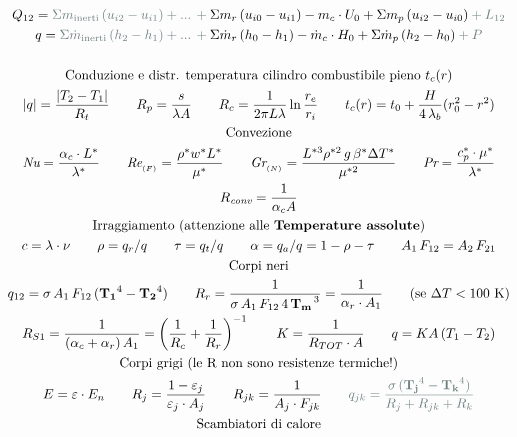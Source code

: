 \documentclass[9pt]{article}
\begin{document}
\begin{multicols}{2}
	\begin{gather*}
		Q_{12} = \color{gray1} \Sigma m_{\text{inerti}} \, (u_{i2} - u_{i1}) + ...  \,  + \color{black} \Sigma m_r \, (u_{i0} - u_{i1}) - m_c \cdot U_0 + \Sigma m_p \, (u_{i2} - u_{i0}) \color{gray1} + L_{12}\\
		q = \color{gray1} \Sigma \dot{m}_{\text{inerti}} \, (h_2-h_1) + ...  \,  + \color{black} \Sigma \dot{m}_r \, (h_0 - h_1) - \dot{m}_c \cdot H_0 + \Sigma \dot{m}_p \, (h_2 - h_0) \color{gray1} + P
		\\\\
		\text{Conduzione e distr. temperatura cilindro combustibile pieno } t_c(r)\\
		|q| = \frac{|T_2 - T_1|}{R_t} \qquad R_p = \frac{s}{\lambda A} \qquad R_c = \frac{1}{2 \pi L \lambda} \ln \frac{r_e}{r_i} \qquad
		t_c(r) = t_0 + \frac{H}{4\, \lambda_b}(r_0^2-r^2)\\
		\text{Convezione}\\
		\textit{Nu} = \frac{\alpha_c \cdot L^*}{\lambda^*} \qquad \textit{Re}_{_{(F)}} = \frac{\rho^* w^* L^*}{\mu^*} \qquad \textit{Gr}_{_{(N)}} = \frac{L^{*3} \rho^{*2}\,g\,\beta^* \Delta T^*}{\mu^{*2}} \qquad \textit{Pr} = \frac{c_p^* \cdot\mu^*}{\lambda^*} \\ R_{\textit{conv}} = \frac{1}{\alpha_c A}
		\\
		\text{Irraggiamento (attenzione alle } \textbf{Temperature assolute} \text{)}\\
		c=\lambda \cdot \nu \qquad \rho = q_r/q \qquad \tau = q_t/q \qquad \alpha = q_a/q=1- \rho - \tau \qquad A_1 \, F_{12} = A_2 \, F_{21}\\
		\text{Corpi neri}\\
		q_{12} = \sigma \, A_1 \, F_{12}\, (\mathbf{T_1}^{4} - \mathbf{T_2}^{4}) \qquad R_r = \frac{1}{\sigma \, A_1 \, F_{12}\, 4\,\mathbf{T_m}^{\,3}}=\frac{1}{\alpha_r \cdot A_1}\qquad\text{(se } \Delta T < 100 \text{ K)}
		\\R_{S1} = \frac{1}{(\alpha_c + \alpha_r) \, A_1} = \left(\frac{1}{R_c}+\frac{1}{R_r}\right)^{-1}\qquad K = \frac{1}{R_{TOT} \cdot A} \qquad q = KA\,(T_1 - T_2)
		\\
		\text{Corpi grigi (le R non sono resistenze termiche!)}\\
		E = \varepsilon \cdot E_n \qquad R_j = \frac{1-\varepsilon_j}{\varepsilon_j \cdot A_j} \qquad R_{jk} = \frac{1}{A_j \cdot F_{jk}} \qquad \color{gray1} q_{jk} = \frac{\sigma \, (\mathbf{T_j}^4 - \mathbf{T_k}^4)}{R_j + R_{jk} + R_k} \color{black}
		\\
		\text{Scambiatori di calore}\\

\end{gather*}
\end{multicols}
\end{document}
